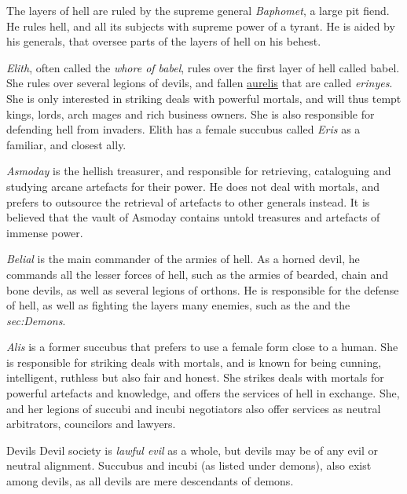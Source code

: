 The layers of hell are ruled by the supreme general \emph{Baphomet}, a large
pit fiend. He rules hell, and all its subjects with supreme power of a
tyrant. He is aided by his generals, that oversee parts of the layers of
hell on his behest.

\emph{Elith}, often called the \emph{whore of babel}, rules over the first
layer of hell called babel. She rules over several legions of devils, and
fallen \hyperref[sec:Aurelis]{aurelis} that are called \emph{erinyes}. She is
only interested in striking deals with powerful mortals, and will thus tempt
kings, lords, arch mages and rich business owners. She is also responsible for
defending hell from invaders. Elith has a female succubus called \emph{Eris}
as a familiar, and closest ally.

\emph{Asmoday} is the hellish treasurer, and responsible for retrieving,
cataloguing and studying arcane artefacts for their power. He does not deal
with mortals, and prefers to outsource the retrieval of artefacts to other
generals instead. It is believed that the vault of Asmoday contains untold
treasures and artefacts of immense power.

\emph{Belial} is the main commander of the armies of hell. As a horned devil,
he commands all the lesser forces of hell, such as the armies of bearded,
chain and bone devils, as well as several legions of orthons. He is
responsible for the defense of hell, as well as fighting the layers many
enemies, such as the  and the \emph{sec:Demons}.

\emph{Alis} is a former succubus that prefers to use a female form close to a
human. She is responsible for striking deals with mortals, and is known for
being cunning, intelligent, ruthless but also fair and honest. She strikes
deals with mortals for powerful artefacts and knowledge, and offers the
services of hell in exchange. She, and her legions of succubi and incubi
negotiators also offer services as neutral arbitrators, councilors and
lawyers.

\begin{35e}{Devils}
  Devil society is \emph{lawful evil} as a whole, but devils may be of any
  evil or neutral alignment. Succubus and incubi (as listed under demons),
  also exist among devils, as all devils are mere descendants of demons.
\end{35e}
